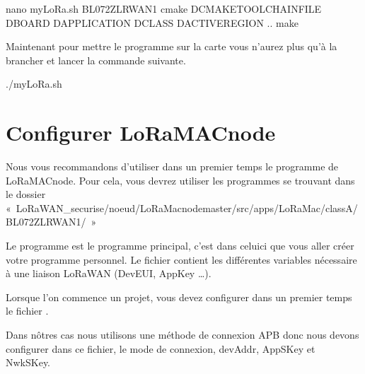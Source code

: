 \documentclass[letterpaper,10pt,french]{sphinxmanual}
\begin{document}
\begin{sphinxVerbatim}[commandchars=\\\{\}]
nano my\PYGZhy{}LoRa.sh
B\PYGZhy{}L072Z\PYGZhy{}LRWAN1
cmake \PYGZhy{}DCMAKE\PYGZus{}TOOLCHAIN\PYGZus{}FILE \PYGZhy{}DBOARD \PYGZhy{}DAPPLICATION \PYGZhy{}DCLASS \PYGZhy{}DACTIVEREGION ..
make
\end{sphinxVerbatim}

Maintenant pour mettre le programme sur la carte vous n’aurez plus qu’à la brancher et lancer la commande suivante.

\begin{sphinxVerbatim}[commandchars=\\\{\}]
./my\PYGZhy{}LoRa.sh
\end{sphinxVerbatim}


\section{Configurer LoRaMAC\sphinxhyphen{}node}
\label{\detokenize{UtilisationLoRa-Node:configurer-loramac-node}}
Nous vous recommandons d’utiliser dans un premier temps le programme  de LoRaMAC\sphinxhyphen{}node.
Pour cela, vous devrez utiliser les programmes se trouvant dans le dossier « LoRaWAN\_securise/noeud/LoRaMac\sphinxhyphen{}node\sphinxhyphen{}master/src/apps/LoRaMac/classA/B\sphinxhyphen{}L072Z\sphinxhyphen{}LRWAN1/ »

Le programme  est le programme principal, c’est dans celui\sphinxhyphen{}ci que vous aller créer votre programme personnel. Le fichier  contient les différentes variables nécessaire à une liaison LoRaWAN (DevEUI, AppKey …).

Lorsque l’on commence un projet, vous devez configurer dans un premier temps le fichier .

Dans nôtres cas nous utilisons une méthode de connexion APB donc nous devons configurer dans ce fichier, le mode de connexion, devAddr, AppSKey et NwkSKey.
\end{document}
